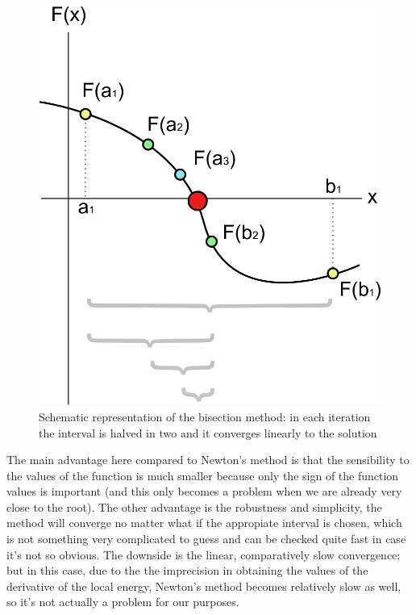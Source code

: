 		\begin{figure}
			\centering \includegraphics[width=0.45\linewidth]{../figures/Bisection_method}
			\protect\caption{Schematic representation of the bisection method: in each iteration the interval is halved in two and it converges linearly to the solution}
		\end{figure}

		The main advantage here compared to Newton's method is that the sensibility to the values of the function is much smaller because only the sign of the function values is important (and this only becomes a problem when we are already very close to the root). The other advantage is the robustness and simplicity, the method will converge no matter what if the appropiate interval is chosen, which is not something very complicated to guess and can be checked quite fast in case it's not so obvious. The downside is the linear, comparatively slow convergence; but in this case, due to the the imprecision in obtaining the values of the derivative of the local energy, Newton's method becomes relatively slow as well, so it's not actually a problem for our purposes.\\
